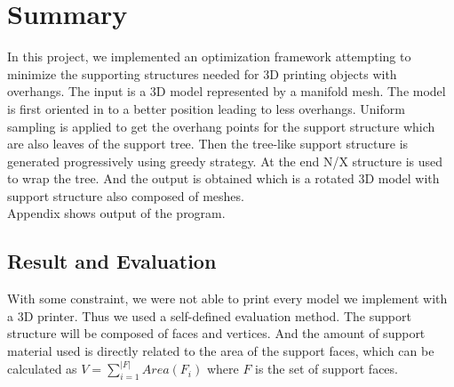 \documentclass[11pt, a4paper]{article}
\begin{document}
	\section{Summary}
	In this project, we implemented an optimization framework attempting to minimize the supporting structures needed for 3D printing objects with overhangs. The input is a 3D model represented by a manifold mesh. The model is first oriented in to a better position leading to less overhangs. Uniform sampling is applied to get the overhang points for the support structure which are also leaves of the support tree. Then the tree-like support structure is generated progressively using greedy strategy. At the end N/X structure is used to wrap the tree. And the output is obtained which is a rotated 3D model with support structure also composed of meshes. 
	~\\Appendix shows output of the program.
	~\\
	\subsection{Result and Evaluation}
	With some constraint, we were not able to print every model we implement with a 3D printer. Thus we used a self-defined evaluation method. The support structure will be composed of faces and vertices. And the amount of support material used is directly related to the area of the support faces, which can be calculated as $V=\sum\limits_{i=1}^{|F|}Area(F_i)$ where $F$ is the set of support faces. 
\end{document}
